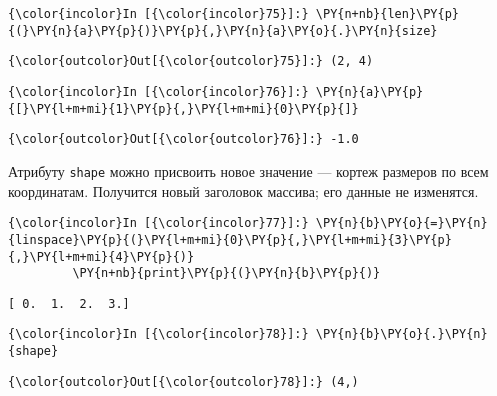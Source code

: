     \begin{Verbatim}[commandchars=\\\{\}]
{\color{incolor}In [{\color{incolor}75}]:} \PY{n+nb}{len}\PY{p}{(}\PY{n}{a}\PY{p}{)}\PY{p}{,}\PY{n}{a}\PY{o}{.}\PY{n}{size}
\end{Verbatim}

            \begin{Verbatim}[commandchars=\\\{\}]
{\color{outcolor}Out[{\color{outcolor}75}]:} (2, 4)
\end{Verbatim}
        
    \begin{Verbatim}[commandchars=\\\{\}]
{\color{incolor}In [{\color{incolor}76}]:} \PY{n}{a}\PY{p}{[}\PY{l+m+mi}{1}\PY{p}{,}\PY{l+m+mi}{0}\PY{p}{]}
\end{Verbatim}

            \begin{Verbatim}[commandchars=\\\{\}]
{\color{outcolor}Out[{\color{outcolor}76}]:} -1.0
\end{Verbatim}
        
    Атрибуту \texttt{shape} можно присвоить новое значение --- кортеж размеров
по всем координатам. Получится новый заголовок массива; его данные не
изменятся.

    \begin{Verbatim}[commandchars=\\\{\}]
{\color{incolor}In [{\color{incolor}77}]:} \PY{n}{b}\PY{o}{=}\PY{n}{linspace}\PY{p}{(}\PY{l+m+mi}{0}\PY{p}{,}\PY{l+m+mi}{3}\PY{p}{,}\PY{l+m+mi}{4}\PY{p}{)}
         \PY{n+nb}{print}\PY{p}{(}\PY{n}{b}\PY{p}{)}
\end{Verbatim}

    \begin{Verbatim}[commandchars=\\\{\}]
[ 0.  1.  2.  3.]

    \end{Verbatim}

    \begin{Verbatim}[commandchars=\\\{\}]
{\color{incolor}In [{\color{incolor}78}]:} \PY{n}{b}\PY{o}{.}\PY{n}{shape}
\end{Verbatim}

            \begin{Verbatim}[commandchars=\\\{\}]
{\color{outcolor}Out[{\color{outcolor}78}]:} (4,)
\end{Verbatim}
        

